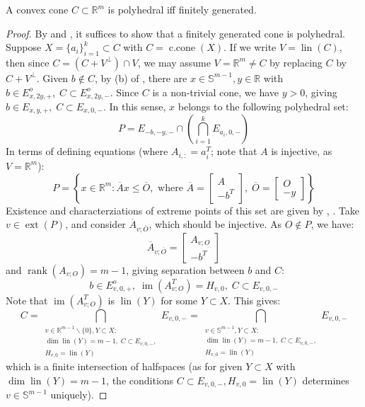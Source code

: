 \begin{prop}\label{prop:017-Minkowski-Weyl-Theorem}
	A convex cone $C\subset \mathbb{R}^m$ is polyhedral iff finitely generated.
\end{prop}
\begin{proof}
	By  and , it suffices to show that a finitely generated cone is polyhedral. Suppose $X=\{a_i\}_{i=1}^{k}\subset C$ with $C=\operatorname{c.cone}(X)$. If we write $V=\operatorname{lin}(C)$, then since $C=(C+V^\perp)\cap V$,	we may assume $V=\mathbb{R}^m\neq C$ by replacing $C$ by $C+V^\perp$. Given $b\notin C$, by (b) of , there are $x\in \mathbb{S}^{m-1},y\in \mathbb{R}$ with $b\in E_{x,2y,+}^o,\; C\subset E_{x,2y,-}^o$.	Since $C$ is a non-trivial cone, we have $y>0$, giving $b\in E_{x,y,+},\; C\subset E_{x,0,-}$. In this sense, $x$ belongs to the following polyhedral set:
	\[
		P = E_{-b,-y,-}\cap\left(\bigcap_{i=1}^k E_{a_i,0,-}\right)
	\]
	In terms of defining equations (where $A_{i,:}=a_i^T$; note that $A$ is injective, as $V=\mathbb{R}^m$):
	\[
		P=
		\left\{x\in \mathbb{R}^m:\overline{A}x\leq\overline{O}
		,\text{ where }
		\overline{A}=\left[
			\begin{array}{r}
				A \\\hline
				-b^T
			\end{array}
			\right],\;
		\overline{O}=\left[
			\begin{array}{r}
				O \\\hline
				-y
			\end{array}
			\right]
		\right\}
	\]
	Existence and characterziations of extreme points of this set are given by , . Take $v\in \operatorname{ext}(P)$, and consider $\overline{A}_{v;\overline{O}}$, which should be injective. As $O\notin P$, we have:
	\[
		\overline{A}_{v;\overline{O}}=
		\left[
			\begin{array}{r}
				A_{v;O} \\\hline
				-b^T
			\end{array}
			\right]
	\]
	and $\operatorname{rank}(A_{v;O})=m-1$, giving separation between $b$ and $C$:
	\[
		b\in E^o_{v,0,+},\; \operatorname{im}(A^T_{v;O})=H_{v,0},\; C\subset E_{v,0,-}
	\]
	Note that $\operatorname{im}(A^T_{v;O})$ is $\operatorname{lin}(Y)$ for some $Y\subset X$. This gives:
	\[
		C = \bigcap_{\substack{
				v\in \mathbb{R}^{m-1}\smallsetminus\{0\},Y\subset X:\\
				\dim \operatorname{lin}(Y)=m-1,\;C\subset E_{v,0,-},\\
				H_{v,0}=\operatorname{lin}(Y)
			}
		}E_{v,0,-}=
		\bigcap_{\substack{
				v\in \mathbb{S}^{m-1},Y\subset X:\\
				\dim \operatorname{lin}(Y)=m-1,\;C\subset E_{v,0,-},\\
				H_{v,0}=\operatorname{lin}(Y)
			}
		}E_{v,0,-}
	\]
	which is a finite intersection of halfspaces (as for given $Y\subset X$ with $\operatorname{dim}\operatorname{lin}(Y)=m-1$, the conditions $C\subset E_{v,0,-},H_{v,0}=\operatorname{lin}(Y)$ determines $v\in \mathbb{S}^{m-1}$ uniquely).
\end{proof}

